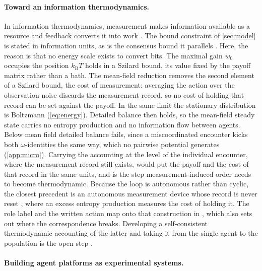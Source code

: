 \documentclass[
  aps,prx,
  reprint,
  superscriptaddress,
  nofootinbib,
  longbibliography
]{revtex4-2}
\newcommand{\smref}[1]{\cite[Sec.~#1]{SM}}
\begin{document}
\paragraph{Toward an information thermodynamics.} In information thermodynamics, measurement makes information available as a resource and feedback converts it into work \cite{barato2014,saha2023}. The bound constraint of \cref{sec:model} is stated in information units, as is the consensus bound it parallels \cite{vansaders2023}. Here, the reason is that no energy scale exists to convert bits. The maximal gain $w_0$ occupies the position $k_{\mathrm B}T$ holds in a Szilard bound, its value fixed by the payoff matrix rather than a bath. The mean-field reduction removes the second element of a Szilard bound, the cost of measurement: averaging the action over the observation noise discards the measurement record, so no cost of holding that record can be set against the payoff. In the same limit the stationary distribution is Boltzmann (\cref{eq:energy}). Detailed balance then holds, so the mean-field steady state carries no entropy production and no information flow between agents. Below mean field detailed balance fails, since a miscoordinated encounter kicks both $\omega$-identities the same way, which no pairwise potential generates (\cref{app:micro}). Carrying the accounting at the level of the individual encounter, where the measurement record still exists, would put the payoff and the cost of that record in the same units, and is the step measurement-induced order needs to become thermodynamic. Because the loop is autonomous rather than cyclic, the closest precedent is an autonomous measurement device whose record is never reset \cite{cocconi2024}, where an excess entropy production measures the cost of holding it. The role label and the written action map onto that construction in \smref{S9}, which also sets out where the correspondence breaks. Developing a self-consistent thermodynamic accounting of the latter and taking it
from the single agent to the population is the open step \cite{parrondo2015}.

\paragraph{Building agent platforms as experimental systems.}
\end{document}
